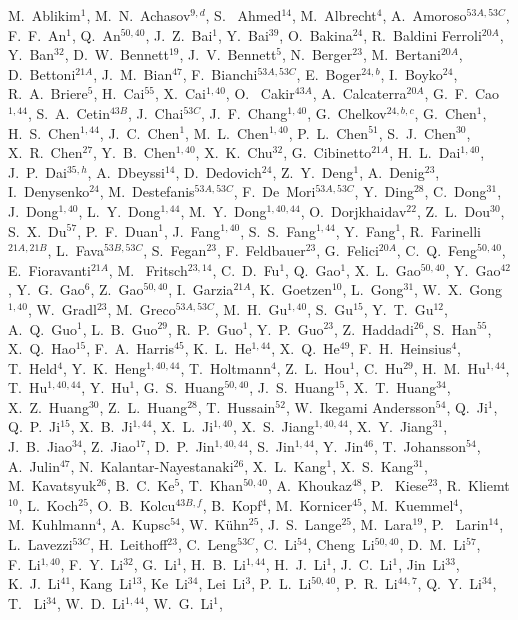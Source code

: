 \begin{small}
\begin{center}
M.~Ablikim$^{1}$, M.~N.~Achasov$^{9,d}$, S. ~Ahmed$^{14}$, M.~Albrecht$^{4}$, A.~Amoroso$^{53A,53C}$, F.~F.~An$^{1}$, Q.~An$^{50,40}$, J.~Z.~Bai$^{1}$, Y.~Bai$^{39}$, O.~Bakina$^{24}$, R.~Baldini Ferroli$^{20A}$, Y.~Ban$^{32}$, D.~W.~Bennett$^{19}$, J.~V.~Bennett$^{5}$, N.~Berger$^{23}$, M.~Bertani$^{20A}$, D.~Bettoni$^{21A}$, J.~M.~Bian$^{47}$, F.~Bianchi$^{53A,53C}$, E.~Boger$^{24,b}$, I.~Boyko$^{24}$, R.~A.~Briere$^{5}$, H.~Cai$^{55}$, X.~Cai$^{1,40}$, O. ~Cakir$^{43A}$, A.~Calcaterra$^{20A}$, G.~F.~Cao$^{1,44}$, S.~A.~Cetin$^{43B}$, J.~Chai$^{53C}$, J.~F.~Chang$^{1,40}$, G.~Chelkov$^{24,b,c}$, G.~Chen$^{1}$, H.~S.~Chen$^{1,44}$, J.~C.~Chen$^{1}$, M.~L.~Chen$^{1,40}$, P.~L.~Chen$^{51}$, S.~J.~Chen$^{30}$, X.~R.~Chen$^{27}$, Y.~B.~Chen$^{1,40}$, X.~K.~Chu$^{32}$, G.~Cibinetto$^{21A}$, H.~L.~Dai$^{1,40}$, J.~P.~Dai$^{35,h}$, A.~Dbeyssi$^{14}$, D.~Dedovich$^{24}$, Z.~Y.~Deng$^{1}$, A.~Denig$^{23}$, I.~Denysenko$^{24}$, M.~Destefanis$^{53A,53C}$, F.~De~Mori$^{53A,53C}$, Y.~Ding$^{28}$, C.~Dong$^{31}$, J.~Dong$^{1,40}$, L.~Y.~Dong$^{1,44}$, M.~Y.~Dong$^{1,40,44}$, O.~Dorjkhaidav$^{22}$, Z.~L.~Dou$^{30}$, S.~X.~Du$^{57}$, P.~F.~Duan$^{1}$, J.~Fang$^{1,40}$, S.~S.~Fang$^{1,44}$, Y.~Fang$^{1}$, R.~Farinelli$^{21A,21B}$, L.~Fava$^{53B,53C}$, S.~Fegan$^{23}$, F.~Feldbauer$^{23}$, G.~Felici$^{20A}$, C.~Q.~Feng$^{50,40}$, E.~Fioravanti$^{21A}$, M. ~Fritsch$^{23,14}$, C.~D.~Fu$^{1}$, Q.~Gao$^{1}$, X.~L.~Gao$^{50,40}$, Y.~Gao$^{42}$, Y.~G.~Gao$^{6}$, Z.~Gao$^{50,40}$, I.~Garzia$^{21A}$, K.~Goetzen$^{10}$, L.~Gong$^{31}$, W.~X.~Gong$^{1,40}$, W.~Gradl$^{23}$, M.~Greco$^{53A,53C}$, M.~H.~Gu$^{1,40}$, S.~Gu$^{15}$, Y.~T.~Gu$^{12}$, A.~Q.~Guo$^{1}$, L.~B.~Guo$^{29}$, R.~P.~Guo$^{1}$, Y.~P.~Guo$^{23}$, Z.~Haddadi$^{26}$, S.~Han$^{55}$, X.~Q.~Hao$^{15}$, F.~A.~Harris$^{45}$, K.~L.~He$^{1,44}$, X.~Q.~He$^{49}$, F.~H.~Heinsius$^{4}$, T.~Held$^{4}$, Y.~K.~Heng$^{1,40,44}$, T.~Holtmann$^{4}$, Z.~L.~Hou$^{1}$, C.~Hu$^{29}$, H.~M.~Hu$^{1,44}$, T.~Hu$^{1,40,44}$, Y.~Hu$^{1}$, G.~S.~Huang$^{50,40}$, J.~S.~Huang$^{15}$, X.~T.~Huang$^{34}$, X.~Z.~Huang$^{30}$, Z.~L.~Huang$^{28}$, T.~Hussain$^{52}$, W.~Ikegami Andersson$^{54}$, Q.~Ji$^{1}$, Q.~P.~Ji$^{15}$, X.~B.~Ji$^{1,44}$, X.~L.~Ji$^{1,40}$, X.~S.~Jiang$^{1,40,44}$, X.~Y.~Jiang$^{31}$, J.~B.~Jiao$^{34}$, Z.~Jiao$^{17}$, D.~P.~Jin$^{1,40,44}$, S.~Jin$^{1,44}$, Y.~Jin$^{46}$, T.~Johansson$^{54}$, A.~Julin$^{47}$, N.~Kalantar-Nayestanaki$^{26}$, X.~L.~Kang$^{1}$, X.~S.~Kang$^{31}$, M.~Kavatsyuk$^{26}$, B.~C.~Ke$^{5}$, T.~Khan$^{50,40}$, A.~Khoukaz$^{48}$, P. ~Kiese$^{23}$, R.~Kliemt$^{10}$, L.~Koch$^{25}$, O.~B.~Kolcu$^{43B,f}$, B.~Kopf$^{4}$, M.~Kornicer$^{45}$, M.~Kuemmel$^{4}$, M.~Kuhlmann$^{4}$, A.~Kupsc$^{54}$, W.~K\"uhn$^{25}$, J.~S.~Lange$^{25}$, M.~Lara$^{19}$, P. ~Larin$^{14}$, L.~Lavezzi$^{53C}$, H.~Leithoff$^{23}$, C.~Leng$^{53C}$, C.~Li$^{54}$, Cheng~Li$^{50,40}$, D.~M.~Li$^{57}$, F.~Li$^{1,40}$, F.~Y.~Li$^{32}$, G.~Li$^{1}$, H.~B.~Li$^{1,44}$, H.~J.~Li$^{1}$, J.~C.~Li$^{1}$, Jin~Li$^{33}$, K.~J.~Li$^{41}$, Kang~Li$^{13}$, Ke~Li$^{34}$, Lei~Li$^{3}$, P.~L.~Li$^{50,40}$, P.~R.~Li$^{44,7}$, Q.~Y.~Li$^{34}$, T. ~Li$^{34}$, W.~D.~Li$^{1,44}$, W.~G.~Li$^{1}$, 
\end{center}
\end{small}
